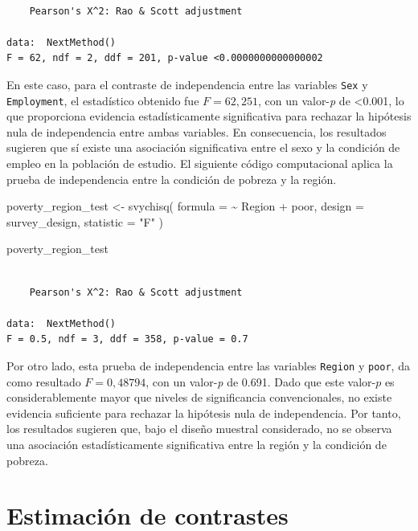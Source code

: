 \documentclass[
  spanish,
  11pt,
  letterpaper,
  oneside,
  open=any]{scrbook}
\newenvironment{Shaded}{\begin{snugshade}}{\end{snugshade}}
\newcommand{\AttributeTok}[1]{\textcolor[rgb]{0.40,0.45,0.13}{#1}}
\newcommand{\FunctionTok}[1]{\textcolor[rgb]{0.28,0.35,0.67}{#1}}
\newcommand{\NormalTok}[1]{\textcolor[rgb]{0.00,0.23,0.31}{#1}}
\newcommand{\OtherTok}[1]{\textcolor[rgb]{0.00,0.23,0.31}{#1}}
\newcommand{\SpecialCharTok}[1]{\textcolor[rgb]{0.37,0.37,0.37}{#1}}
\newcommand{\StringTok}[1]{\textcolor[rgb]{0.13,0.47,0.30}{#1}}
\begin{document}
\begin{verbatim}

    Pearson's X^2: Rao & Scott adjustment

data:  NextMethod()
F = 62, ndf = 2, ddf = 201, p-value <0.0000000000000002
\end{verbatim}

En este caso, para el contraste de independencia entre las variables
\texttt{Sex} y \texttt{Employment}, el estadístico obtenido fue
\(F = 62,251\), con un valor-\emph{p} de \textless0.001, lo que
proporciona evidencia estadísticamente significativa para rechazar la
hipótesis nula de independencia entre ambas variables. En consecuencia,
los resultados sugieren que sí existe una asociación significativa entre
el sexo y la condición de empleo en la población de estudio. El
siguiente código computacional aplica la prueba de independencia entre
la condición de pobreza y la región.

\begin{Shaded}
\begin{Highlighting}[]
\NormalTok{poverty\_region\_test }\OtherTok{\textless{}{-}} \FunctionTok{svychisq}\NormalTok{(}
  \AttributeTok{formula =} \SpecialCharTok{\textasciitilde{}}\NormalTok{ Region }\SpecialCharTok{+}\NormalTok{ poor,}
  \AttributeTok{design =}\NormalTok{ survey\_design,}
  \AttributeTok{statistic =} \StringTok{"F"}
\NormalTok{)}

\NormalTok{poverty\_region\_test}
\end{Highlighting}
\end{Shaded}

\begin{verbatim}

    Pearson's X^2: Rao & Scott adjustment

data:  NextMethod()
F = 0.5, ndf = 3, ddf = 358, p-value = 0.7
\end{verbatim}

Por otro lado, esta prueba de independencia entre las variables
\texttt{Region} y \texttt{poor}, da como resultado \(F = 0,48794\), con
un valor-\emph{p} de 0.691. Dado que este valor-\(p\) es
considerablemente mayor que niveles de significancia convencionales, no
existe evidencia suficiente para rechazar la hipótesis nula de
independencia. Por tanto, los resultados sugieren que, bajo el diseño
muestral considerado, no se observa una asociación estadísticamente
significativa entre la región y la condición de pobreza.

\section{Estimación de
contrastes}\label{sec-contrastes-y-diferencias-de-proporciones}
\end{document}
